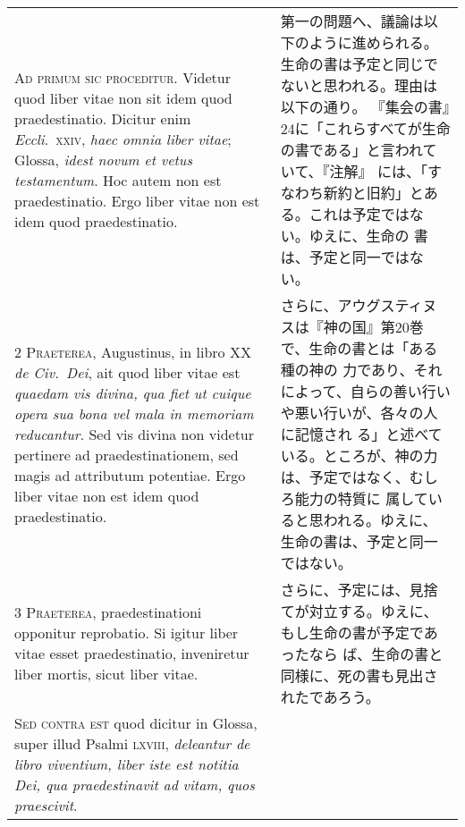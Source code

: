 \documentclass[10pt]{jsarticle} %
\begin{document}
\begin{longtable}{p{21em}p{21em}}

{\Huge A}{\scshape d primum sic proceditur}. Videtur quod liber vitae
 non sit idem quod praedestinatio. Dicitur enim {\itshape Eccli}.~{\scshape xxiv}, {\itshape haec omnia
 liber vitae}; Glossa, {\itshape idest novum et vetus testamentum}. Hoc autem non
 est praedestinatio. Ergo liber vitae non est idem quod praedestinatio.

&

第一の問題へ、議論は以下のように進められる。
生命の書は予定と同じでないと思われる。理由は以下の通り。
『集会の書』24に「これらすべてが生命の書である」と言われていて、『注解』
 には、「すなわち新約と旧約」とある。これは予定ではない。ゆえに、生命の
 書は、予定と同一ではない。

\\

{\scshape 2 Praeterea}, Augustinus, in libro XX {\itshape de
 Civ.~Dei}, ait quod liber vitae est {\itshape quaedam vis divina, qua fiet ut
 cuique opera sua bona vel mala in memoriam reducantur}. Sed vis divina
 non videtur pertinere ad praedestinationem, sed magis ad attributum
 potentiae. Ergo liber vitae non est idem quod praedestinatio.


&

さらに、アウグスティヌスは『神の国』第20巻で、生命の書とは「ある種の神の
 力であり、それによって、自らの善い行いや悪い行いが、各々の人に記憶され
 る」と述べている。ところが、神の力は、予定ではなく、むしろ能力の特質に
 属していると思われる。ゆえに、生命の書は、予定と同一ではない。

\\



{\scshape 3 Praeterea}, praedestinationi opponitur
 reprobatio. Si igitur liber vitae esset praedestinatio, inveniretur
 liber mortis, sicut liber vitae.


&

さらに、予定には、見捨てが対立する。ゆえに、もし生命の書が予定であったなら
 ば、生命の書と同様に、死の書も見出されたであろう。

\\



{\scshape Sed contra est} quod dicitur in Glossa, super
 illud Psalmi {\scshape lxviii}, {\itshape deleantur de libro viventium, liber iste est
 notitia Dei, qua praedestinavit ad vitam, quos praescivit}.


&


\end{longtable}
\end{document}
